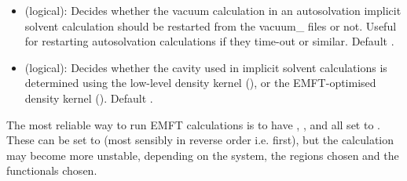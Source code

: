 \documentclass[letterpaper,10pt,english]{sphinxmanual}
\begin{document}
\begin{itemize}
\item {} 
 (logical): Decides whether the vacuum
calculation in an autosolvation implicit solvent calculation should
be restarted from the vacuum\_ files or not. Useful for restarting
autosolvation calculations if they time-out or similar. Default
.

\item {} 
 (logical): Decides whether the cavity used in
implicit solvent calculations is determined using the low-level
density kernel (), or the EMFT-optimised density kernel ().
Default .

\end{itemize}

The most reliable way to run EMFT calculations is to have ,
,  and 
all set to . These can be set to  (most sensibly in reverse
order i.e.  first), but the calculation may
become more unstable, depending on the system, the regions chosen and
the functionals chosen.
\end{document}
